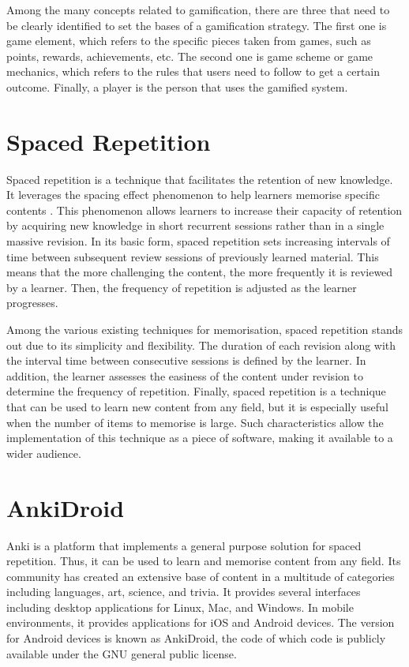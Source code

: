 Among the many concepts related to gamification, there are three that need to be clearly identified to set the bases of a gamification strategy. The first one is game element, which refers to the specific pieces taken from games, such as points, rewards, achievements, etc. The second one is game scheme or game mechanics, which refers to the rules that users need to follow to get a certain outcome. Finally, a player is the person that uses the gamified system.

\section{Spaced Repetition}
Spaced repetition is a technique that facilitates the retention of new knowledge. It leverages the spacing effect phenomenon to help learners memorise specific contents \citep{hintzman1974theoretical}. This phenomenon allows learners to increase their capacity of retention by acquiring new knowledge in short recurrent sessions rather than in a single massive revision. In its basic form, spaced repetition sets increasing intervals of time between subsequent review sessions of previously learned material. This means that the more challenging the content, the more frequently it is reviewed by a learner. Then, the frequency of repetition is adjusted as the learner progresses.

Among the various existing techniques for memorisation, spaced repetition stands out due to its simplicity and flexibility. The duration of each revision along with the interval time between consecutive sessions is defined by the learner. In addition, the learner assesses the easiness of the content under revision to determine the frequency of repetition. Finally, spaced repetition is a technique that can be used to learn new content from any field, but it is especially useful when the number of items to memorise is large. Such characteristics allow the implementation of this technique as a piece of software, making it available to a wider audience.

\section{AnkiDroid}
Anki is a platform that implements a general purpose solution for spaced repetition. Thus, it can be used to learn and memorise content from any field. Its community has created an extensive base of content in a multitude of categories including languages, art, science, and trivia. It provides several interfaces including desktop applications for Linux, Mac, and Windows. In mobile environments, it provides applications for iOS and Android devices. The version for Android devices is known as AnkiDroid, the code of which code is publicly available under the GNU general public license.

